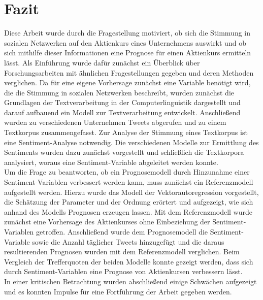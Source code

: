 \documentclass[
	a4paper,
	12pt,
	bibliography=totocnumbered,
	twoside,
]{scrreprt}
\begin{document}
\chapter{Fazit}
Diese Arbeit wurde durch die Fragestellung motiviert, ob sich die Stimmung in sozialen Netzwerken auf den Aktienkurs eines Unternehmens auswirkt und ob sich mithilfe dieser Informationen eine Prognose für einen Aktienkurs ermitteln lässt. Als Einführung wurde dafür zunächst ein Überblick über Forschungsarbeiten mit ähnlichen Fragestellungen gegeben und deren Methoden verglichen. Da für eine eigene Vorhersage zunächst eine Variable benötigt wird, die die Stimmung in sozialen Netzwerken beschreibt, wurden zunächst die Grundlagen der Textverarbeitung in der Computerlinguistik dargestellt und darauf aufbauend ein Modell zur Textverarbeitung entwickelt. Anschließend wurden zu verschiedenen Unternehmen Tweets abgerufen und zu einem Textkorpus zusammengefasst. Zur Analyse der Stimmung eines Textkorpus ist eine Sentiment-Analyse notwendig. Die verschiedenen Modelle zur Ermittlung des Sentiments wurden dazu zunächst vorgestellt und schließlich die Textkorpora analysiert, woraus eine Sentiment-Variable abgeleitet werden konnte.\\

Um die Frage zu beantworten, ob ein Prognosemodell durch Hinzunahme einer Sentiment-Variablen verbessert werden kann, muss zunächst ein Referenzmodell aufgestellt werden. Hierzu wurde das Modell der Vektorautoregression vorgestellt, die Schätzung der Parameter und der Ordnung erörtert und aufgezeigt, wie sich anhand des Modells Prognosen erzeugen lassen. Mit dem Referenzmodell wurde zunächst eine Vorhersage des Aktienkurses ohne Einbeziehung der Sentiment-Variablen getroffen. Anschließend wurde dem Prognosemodell die Sentiment-Variable sowie die Anzahl täglicher Tweets hinzugefügt und die daraus resultierenden Prognosen wurden mit dem Referenzmodell verglichen. Beim Vergleich der Trefferquoten der beiden Modelle konnte gezeigt werden, dass sich durch Sentiment-Variablen eine Prognose von Aktienkursen verbessern lässt.\\

In einer kritischen Betrachtung wurden abschließend einige Schwächen aufgezeigt und es konnten Impulse für eine Fortführung der Arbeit gegeben werden.\\



\appendix
{}				%
\end{document}
